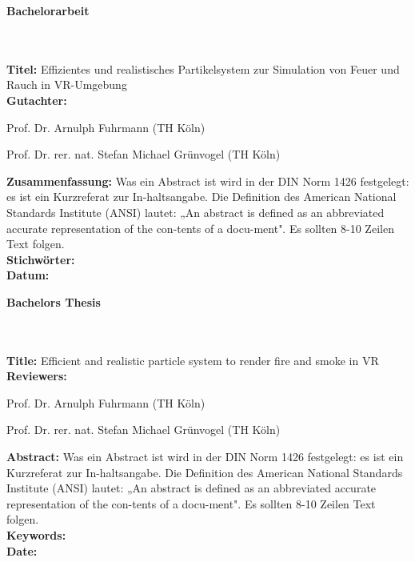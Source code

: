 
\begin{flushleft}
    \begin{huge}
        \textbf{Bachelorarbeit}
    \end{huge}
    ~\\
    ~\\
    \textbf{Titel:}  Effizientes und realistisches Partikelsystem zur Simulation von Feuer und Rauch in VR-Umgebung
    ~\\
    \doublespacing
    \textbf{Gutachter:}
    \begin{description}
        \vspace{-0.2cm}
        \itemsep-8pt
        \item[–]
            Prof. Dr. Arnulph Fuhrmann (TH Köln)
        \item[–]
            Prof. Dr. rer. nat. Stefan Michael Grünvogel (TH Köln)
    \end{description}
    \vspace{-0.5cm}
    \singlespacing
    \textbf{Zusammenfassung:} Was ein Abstract ist wird in der DIN Norm 1426 festgelegt: es ist ein Kurzreferat zur In-haltsangabe. Die Definition des American National Standards Institute (ANSI) lautet: „An abstract is defined as an abbreviated accurate representation of the con-tents of a docu-ment". Es sollten 8-10 Zeilen Text folgen.
    ~\\
    \doublespacing
    \textbf{Stichwörter:} \\
    \textbf{Datum:}

\end{flushleft}
\vspace{2cm}

\begin{flushleft}
    \begin{huge}
        \textbf{Bachelors Thesis}
    \end{huge}
    ~\\
    ~\\
    \textbf{Title:} Efficient and realistic particle system to render fire and smoke in VR
    ~\\
    \doublespacing
    \textbf{Reviewers:}
    \begin{description}
        \vspace{-0.2cm}
        \itemsep-8pt
        \item[–]
            Prof. Dr. Arnulph Fuhrmann (TH Köln)
        \item[–]
            Prof. Dr. rer. nat. Stefan Michael Grünvogel (TH Köln)
    \end{description}
    \vspace{-0.5cm}
    \singlespacing
    \textbf{Abstract:} Was ein Abstract ist wird in der DIN Norm 1426 festgelegt: es ist ein Kurzreferat zur In-haltsangabe. Die Definition des American National Standards Institute (ANSI) lautet: „An abstract is defined as an abbreviated accurate representation of the con-tents of a docu-ment". Es sollten 8-10 Zeilen Text folgen.
    ~\\
    \doublespacing
    \textbf{Keywords:} \\
    \textbf{Date:}
\end{flushleft}